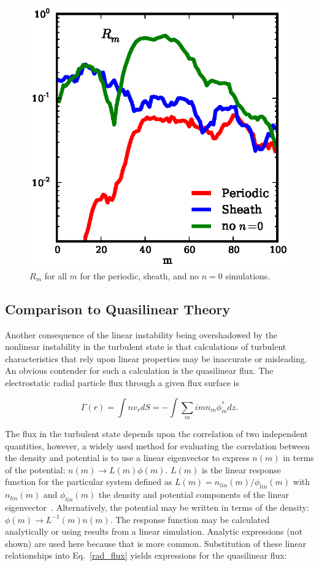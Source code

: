 \documentclass[showpacs,preprintnumbers,amsmath,amssymb,superscriptaddress,aip]{revtex4-1}
\def\beq{\begin{equation}}
\def\eeq{\end{equation}}
\begin{document}
\begin{figure}[!htbp]
\includegraphics[]{ratios}
\hfil
\caption{$R_m$ for all $m$ for the periodic, sheath, and no $n=0$ simulations.}
\label{ratios}
\end{figure}


\subsection{Comparison to Quasilinear Theory}
\label{subsec_quasilinear}

Another consequence of the linear instability being overshadowed by the nonlinear instability in the turbulent state is that 
calculations of turbulent characteristics that rely upon linear properties may be
inaccurate or misleading. An obvious contender for such a calculation is the quasilinear flux.
The electrostatic radial particle flux through a given flux surface is

\beq
\label{rad_flux}
\Gamma(r) = \int n v_r dS = - \int \sum_m i m n_m \phi_m^* dz.
\eeq

The flux in the turbulent state depends upon the correlation of two independent quantities, however, a widely used method for evaluating the correlation between the density and potential is
to use a linear eigenvector to express $n(m)$ in terms of the potential: $n(m) \rightarrow L(m) \phi(m)$. $L(m)$ is the linear response function for the particular system
defined as $L(m) = n_{lin}(m)/\phi_{lin}(m)$ with $n_{lin}(m)$ and $\phi_{lin}(m)$ the density and potential components of the linear eigenvector~\cite{terry2006a}. 
Alternatively, the potential may be written in terms of the density: $\phi(m) \rightarrow L^{-1}(m) n(m)$. 
The response function may be calculated analytically or using results from a linear simulation. Analytic expressions (not shown)
are used here because that is more common.
Substitution of these linear relationships into Eq.~\ref{rad_flux} yields expressions for the quasilinear flux:
\end{document}
